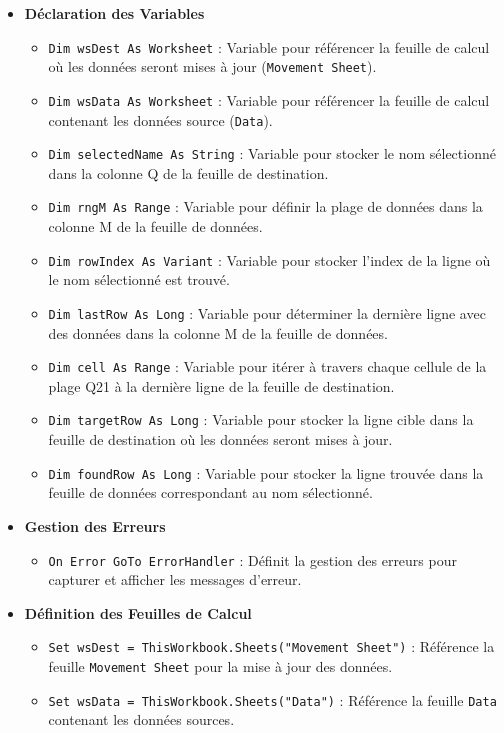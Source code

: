 \documentclass[a4paper, oneside, 12pt, final]{extreport}
\begin{document}
\begin{itemize}
    \item \textbf{Déclaration des Variables}
    \begin{itemize}
        \item \texttt{Dim wsDest As Worksheet} : Variable pour référencer la feuille de calcul où les données seront mises à jour (\texttt{Movement Sheet}).
        \item \texttt{Dim wsData As Worksheet} : Variable pour référencer la feuille de calcul contenant les données source (\texttt{Data}).
        \item \texttt{Dim selectedName As String} : Variable pour stocker le nom sélectionné dans la colonne Q de la feuille de destination.
        \item \texttt{Dim rngM As Range} : Variable pour définir la plage de données dans la colonne M de la feuille de données.
        \item \texttt{Dim rowIndex As Variant} : Variable pour stocker l'index de la ligne où le nom sélectionné est trouvé.
        \item \texttt{Dim lastRow As Long} : Variable pour déterminer la dernière ligne avec des données dans la colonne M de la feuille de données.
        \item \texttt{Dim cell As Range} : Variable pour itérer à travers chaque cellule de la plage Q21 à la dernière ligne de la feuille de destination.
        \item \texttt{Dim targetRow As Long} : Variable pour stocker la ligne cible dans la feuille de destination où les données seront mises à jour.
        \item \texttt{Dim foundRow As Long} : Variable pour stocker la ligne trouvée dans la feuille de données correspondant au nom sélectionné.
    \end{itemize}

    \item \textbf{Gestion des Erreurs} 
    \begin{itemize}
        \item \texttt{On Error GoTo ErrorHandler} : Définit la gestion des erreurs pour capturer et afficher les messages d'erreur.
    \end{itemize}

    \item \textbf{Définition des Feuilles de Calcul} 
    \begin{itemize}
        \item \texttt{Set wsDest = ThisWorkbook.Sheets("Movement Sheet")} : Référence la feuille \texttt{Movement Sheet} pour la mise à jour des données.
        \item \texttt{Set wsData = ThisWorkbook.Sheets("Data")} : Référence la feuille \texttt{Data} contenant les données sources.
    \end{itemize}


\end{itemize}
\end{document}

